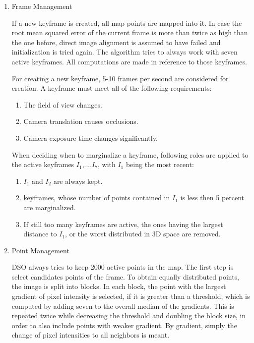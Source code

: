 	\begin{enumerate}
	\item{Frame Management}
	
	If a new keyframe is created, all map points are mapped into it. In case the root mean squared error of the current frame is more than twice as high than the one before, 
	direct image alignment is assumed to have failed and initialization is tried again. The algorithm tries to always work with seven active keyframes. All computations are 
	made in reference to those keyframes. 
	
	For creating a new keyframe, 5-10 frames per second are considered for creation. A keyframe must meet all of the following requirements: 
	
	\begin{enumerate}
	\item{}
	The field of view changes.
	\item{}
	Camera translation causes occlusions. %
	\item{}
	Camera exposure time changes significantly. 
	\end{enumerate}
	
	When deciding when to marginalize a keyframe, following roles are applied to the active keyframes $I_1$,...,$I_7$, with $I_1$ being the most recent: 
	
	\begin{enumerate}
	\item{}
	$I_1$ and $I_2$ are always kept.
	\item{}
	keyframes, whose number of points contained in $I_1$ is less then 5 percent are marginalized.
	\item{}
	If still too many keyframes are active, the ones having the largest distance to $I_1$, or the worst distributed in 3D space are removed. 
	\end{enumerate}
	
	\item{Point Management}
	
	DSO always tries to keep 2000 active points in the map. The first step is select candidates points of the frame. To obtain equally 
	distributed points, the image is split into blocks. In each block, the point with the largest gradient of pixel intensity is selected, if 
	it is greater than a threshold, which is computed by adding seven to the overall median of the gradients. This is repeated twice while 
	decreasing the threshold and doubling the block size, in order to also include points with weaker gradient. 
	By gradient, simply the change of pixel intensities to all neighbors is meant. 
	

\end{enumerate}
